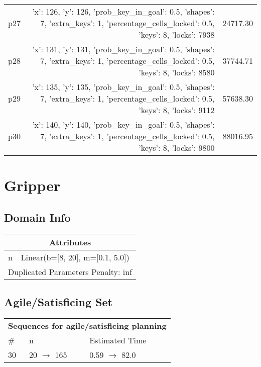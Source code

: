 \documentclass{article}
\begin{document}
\begin{center}
\begin{tabular}{@{}l|r|r@{}}
  p27&{'x': 126, 'y': 126, 'prob\_key\_in\_goal': 0.5, 'shapes': 7, 'extra\_keys': 1, 'percentage\_cells\_locked': 0.5, 'keys': 8, 'locks': 7938}&24717.30\\
  p28&{'x': 131, 'y': 131, 'prob\_key\_in\_goal': 0.5, 'shapes': 7, 'extra\_keys': 1, 'percentage\_cells\_locked': 0.5, 'keys': 8, 'locks': 8580}&37744.71\\
  p29&{'x': 135, 'y': 135, 'prob\_key\_in\_goal': 0.5, 'shapes': 7, 'extra\_keys': 1, 'percentage\_cells\_locked': 0.5, 'keys': 8, 'locks': 9112}&57638.30\\
  p30&{'x': 140, 'y': 140, 'prob\_key\_in\_goal': 0.5, 'shapes': 7, 'extra\_keys': 1, 'percentage\_cells\_locked': 0.5, 'keys': 8, 'locks': 9800}&88016.95
                            \end{tabular}
                            \end{center}
                    
                            \newpage \section{Gripper}
                    \subsection*{Domain Info}

                    \begin{center}
                    \begin{tabular}{@{}p{}p{}@{}}
                    \multicolumn{2}{c}{\bf \large Attributes}\\\midrule
                    n & Linear(b=[8, 20], m=[0.1, 5.0])
                    
                     \\\midrule
                    \multicolumn{2}{l}{Duplicated Parameters Penalty: inf}
                    \end{tabular}
                    \end{center}
                
                         \subsection*{Agile/Satisficing Set}

                        \begin{center}
                        \begin{tabular}{@{}l|l|l@{}}
                        \multicolumn{3}{c}{\bf \large Sequences for agile/satisficing planning}\\
                        \# & n & Estimated Time\\\midrule
                        30&20 $\rightarrow$ 165&0.59 $\rightarrow$ 82.0
                        \end{tabular}
                        \end{center}
                    
\end{document}
